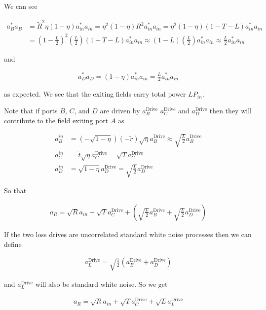 \documentclass[12pt]{article}
\begin{document}
We can see

\begin{align}
a_B^* a_B &= \tilde{R}^2 \eta (1-\eta) a^*_{in}a_{in}= \eta^2(1-\eta)R^2 a^*_{in}a_{in} = \eta^2(1-\eta)(1-T-L) a^*_{in}a_{in}\\
&= \left(1-\frac{L}{2}\right)^2\left(\frac{L}{2}\right)(1-T-L) a^*_{in}a_{in} \approx (1-L)\left(\frac{L}{2}\right) a^*_{in}a_{in} \approx \frac{L}{2}a^*_{in}a_{in}
\end{align}

and

\begin{align}
a^*_D a_D = (1-\eta)a^*_{in}a_{in} = \frac{L}{2}a^*_{in}a_{in}
\end{align}

as expected. We see that the exiting fields carry total power $L P_{in}$.

Note that if ports $B$, $C$, and $D$ are driven by $a_B^{\text{Drive}}$ $a_C^{\text{Drive}}$ and $a_D^{\text{Drive}}$ then they will contribute to the field exiting port $A$ as

\begin{align}
a_B^{in} &= (-\sqrt{1-\eta})(-\tilde{r})\sqrt{\eta} a_B^{\text{Drive}} \approx \sqrt{\frac{L}{2}} a_B^{\text{Drive}}\\
a_C^{in}&= \tilde{t} \sqrt{\eta} a_C^{\text{Drive}} = \sqrt{T}a_C^{\text{Drive}}\\
a_D^{in} &= \sqrt{1-\eta}a_D^{\text{Drive}} = \sqrt{\frac{L}{2}} a_D^{\text{Drive}}
\end{align}

So that

\begin{align}
a_R = \sqrt{R} a_{in} + \sqrt{T}a_C^{\text{Drive}} + \left(\sqrt{\frac{L}{2}} a_B^{\text{Drive}} + \sqrt{\frac{L}{2}} a_D^{\text{Drive}} \right)
\end{align}

If the two loss drives are uncorrelated standard white noise processes then we can define

\begin{align}
a_L^{\text{Drive}} = \sqrt{\frac{1}{2}}\left(a_B^{\text{Drive}} + a_D^{\text{Drive}}\right)
\end{align}

and $a_L^{\text{Drive}}$ will also be standard white noise. So we get

\begin{align}
a_R = \sqrt{R} a_{in} + \sqrt{T}a_C^{\text{Drive}} + \sqrt{L} a_L^{\text{Drive}}
\end{align}
\end{document}
